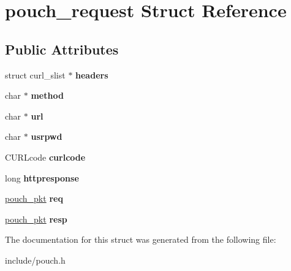 \hypertarget{structpouch__request}{
\section{pouch\_\-request Struct Reference}
\label{structpouch__request}
}
\subsection*{Public Attributes}
\begin{DoxyCompactItemize}
\item 
\hypertarget{structpouch__request_a1422e37fe5f07175f311699414be01d4}{
struct curl\_\-slist $\ast$ {\bfseries headers}}
\label{structpouch__request_a1422e37fe5f07175f311699414be01d4}

\item 
\hypertarget{structpouch__request_ab8805c0be5822da4937a355d148c60b7}{
char $\ast$ {\bfseries method}}
\label{structpouch__request_ab8805c0be5822da4937a355d148c60b7}

\item 
\hypertarget{structpouch__request_af6365d11b66eeede2ae97c94e15a0c03}{
char $\ast$ {\bfseries url}}
\label{structpouch__request_af6365d11b66eeede2ae97c94e15a0c03}

\item 
\hypertarget{structpouch__request_ab9e4e95858dc51d74d763f791e2931ec}{
char $\ast$ {\bfseries usrpwd}}
\label{structpouch__request_ab9e4e95858dc51d74d763f791e2931ec}

\item 
\hypertarget{structpouch__request_a91b7cb23a59bbafe8575055e0e99f9b7}{
CURLcode {\bfseries curlcode}}
\label{structpouch__request_a91b7cb23a59bbafe8575055e0e99f9b7}

\item 
\hypertarget{structpouch__request_a1efdcd65e2280b56ee375beb27e85e95}{
long {\bfseries httpresponse}}
\label{structpouch__request_a1efdcd65e2280b56ee375beb27e85e95}

\item 
\hypertarget{structpouch__request_a00397b825f125196d455436a4a5a6a1d}{
\hyperlink{structpouch__pkt}{pouch\_\-pkt} {\bfseries req}}
\label{structpouch__request_a00397b825f125196d455436a4a5a6a1d}

\item 
\hypertarget{structpouch__request_a0b6a0c43c6c1882d69a526075a85411c}{
\hyperlink{structpouch__pkt}{pouch\_\-pkt} {\bfseries resp}}
\label{structpouch__request_a0b6a0c43c6c1882d69a526075a85411c}

\end{DoxyCompactItemize}


The documentation for this struct was generated from the following file:\begin{DoxyCompactItemize}
\item 
include/pouch.h\end{DoxyCompactItemize}
